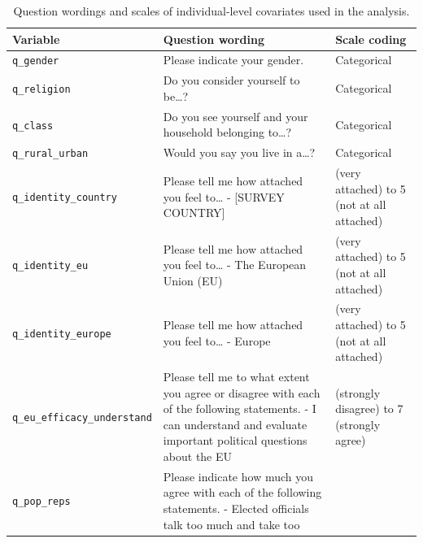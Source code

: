 \documentclass[
  10pt,
  a4paper,
  DIV=11,
  numbers=noendperiod]{scrartcl}
\begin{document}
\begin{longtable}[]{@{}
  >{\raggedright\arraybackslash}p{}
  >{\raggedright\arraybackslash}p{}
  >{\raggedright\arraybackslash}p{}@{}}

\caption{\label{tbl-wordings}Question wordings and scales of
individual-level covariates used in the analysis.}

\tabularnewline

\toprule\noalign{}
\begin{minipage}[b]{\linewidth}\raggedright
Variable
\end{minipage} & \begin{minipage}[b]{\linewidth}\raggedright
Question wording
\end{minipage} & \begin{minipage}[b]{\linewidth}\raggedright
Scale coding
\end{minipage} \\
\midrule\noalign{}
\endhead
\bottomrule\noalign{}
\endlastfoot
\texttt{q\_gender} & Please indicate your gender. & Categorical \\
\texttt{q\_religion} & Do you consider yourself to be\ldots? &
Categorical \\
\texttt{q\_class} & Do you see yourself and your household belonging
to\ldots? & Categorical \\
\texttt{q\_rural\_urban} & Would you say you live in a\ldots? &
Categorical \\
\texttt{q\_identity\_country} & Please tell me how attached you feel
to\ldots{} - {[}SURVEY COUNTRY{]} & 1 (very attached) to 5 (not at all
attached) \\
\texttt{q\_identity\_eu} & Please tell me how attached you feel
to\ldots{} - The European Union (EU) & 1 (very attached) to 5 (not at
all attached) \\
\texttt{q\_identity\_europe} & Please tell me how attached you feel
to\ldots{} - Europe & 1 (very attached) to 5 (not at all attached) \\
\texttt{q\_eu\_efficacy\_understand} & Please tell me to what extent you
agree or disagree with each of the following statements. - I can
understand and evaluate important political questions about the EU & 1
(strongly disagree) to 7 (strongly agree) \\
\texttt{q\_pop\_reps} & Please indicate how much you agree with each of
the following statements. - Elected officials talk too much and take too

\end{longtable}
\end{document}
